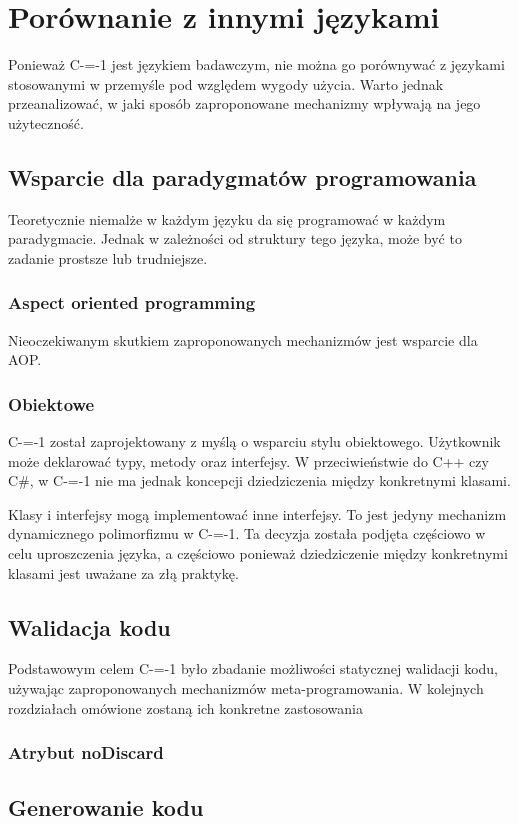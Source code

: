 \section{Porównanie z innymi językami}
Ponieważ C-=-1 jest językiem badawczym, nie można go porównywać z językami stosowanymi w przemyśle pod względem wygody użycia. Warto jednak przeanalizować, w jaki sposób zaproponowane mechanizmy wpływają na jego użyteczność.
\subsection{Wsparcie dla paradygmatów programowania}
Teoretycznie niemalże w każdym języku da się programować w każdym paradygmacie. Jednak w zależności od struktury tego języka, może być to zadanie prostsze lub trudniejsze. 
\subsubsection{Aspect oriented programming}
Nieoczekiwanym skutkiem zaproponowanych mechanizmów jest wsparcie dla AOP.
\subsubsection{Obiektowe}
C-=-1 został zaprojektowany z myślą o wsparciu stylu obiektowego. Użytkownik może deklarować typy, metody oraz interfejsy. W przeciwieństwie do C++ czy C\#, w C-=-1 nie ma jednak koncepcji dziedziczenia między konkretnymi klasami.

Klasy i interfejsy mogą implementować inne interfejsy. To jest jedyny mechanizm dynamicznego polimorfizmu w C-=-1. Ta decyzja została podjęta częściowo w celu uproszczenia języka, a częściowo ponieważ dziedziczenie między konkretnymi klasami jest uważane za złą praktykę.

\subsection{Walidacja kodu}
Podstawowym celem C-=-1 było zbadanie możliwości statycznej walidacji kodu, używając zaproponowanych mechanizmów meta-programowania. W kolejnych rozdziałach omówione zostaną ich konkretne zastosowania 
\subsubsection{Atrybut noDiscard}

\subsection{Generowanie kodu}

